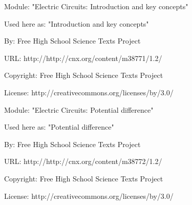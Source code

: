       \par\vspace{9pt}\noindent\begin{minipage}{\textwidth}
      Module: "Electric Circuits: Introduction and key concepts" \par\nopagebreak\noindent
      Used here as: "Introduction and key concepts" \par\nopagebreak\noindent
        By: Free High School Science Texts Project\par\nopagebreak\noindent
      URL: http://http://cnx.org/content/m38771/1.2/\par\nopagebreak\noindent
      \par\nopagebreak\noindent
      Copyright: Free High School Science Texts Project\par\nopagebreak\noindent
      License:  http://creativecommons.org/licenses/by/3.0/\par\nopagebreak\noindent
      \par\end{minipage}
      \par\vspace{9pt}\noindent\begin{minipage}{\textwidth}
      Module: "Electric Circuits: Potential difference" \par\nopagebreak\noindent
      Used here as: "Potential difference" \par\nopagebreak\noindent
        By: Free High School Science Texts Project\par\nopagebreak\noindent
      URL: http://http://cnx.org/content/m38772/1.2/\par\nopagebreak\noindent
      \par\nopagebreak\noindent
      Copyright: Free High School Science Texts Project\par\nopagebreak\noindent
      License:  http://creativecommons.org/licenses/by/3.0/\par\nopagebreak\noindent
      \par\end{minipage}
